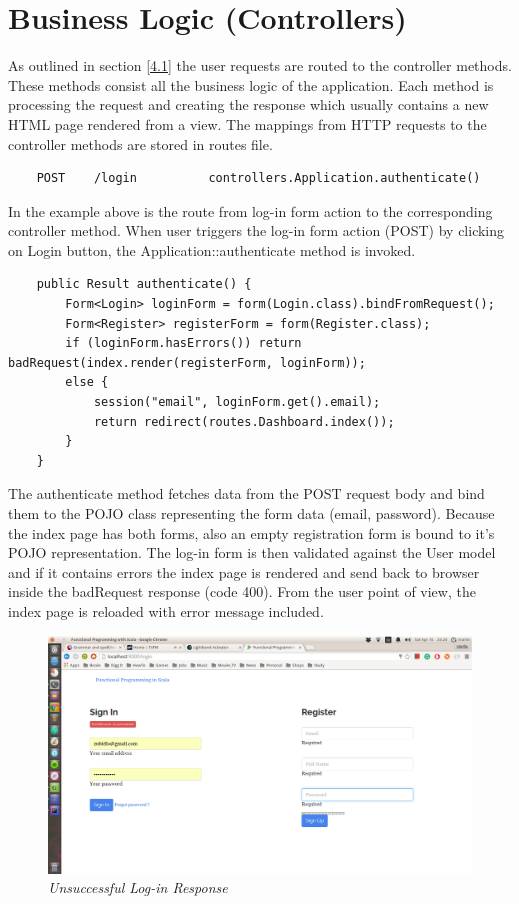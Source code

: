 \documentclass[12pt,twoside,a4paper]{report}
\begin{document}
\section{Business Logic (Controllers)}\label{4.5}
As outlined in section \ref{4.1} the user requests are routed to the controller methods. These methods consist all the business logic of the application. Each method is processing the request and creating the response which usually contains a new HTML page rendered from a view. The mappings from HTTP requests to the controller methods are stored in routes file.

\begin{lstlisting}
	POST    /login     		controllers.Application.authenticate()
\end{lstlisting}

In the example above is the route from log-in form action to the corresponding controller method. When user triggers the log-in form action (POST) by clicking on Login button, the Application::authenticate method is invoked.

\begin{lstlisting}
	public Result authenticate() {
        Form<Login> loginForm = form(Login.class).bindFromRequest();
        Form<Register> registerForm = form(Register.class);
        if (loginForm.hasErrors()) return badRequest(index.render(registerForm, loginForm));
        else {
            session("email", loginForm.get().email);
            return redirect(routes.Dashboard.index());
        }
    }
\end{lstlisting}

The authenticate method fetches data from the POST request body and bind them to the POJO class representing the form data (email, password). Because the index page has both forms, also an empty registration form is bound to it's POJO representation. The log-in form is then validated against the User model and if it contains errors the index page is rendered and send back to browser inside the badRequest response (code 400). From the user point of view, the index page is reloaded with error message included.

\begin{figure}[!ht]
	\centering
		\includegraphics[width=1\textwidth, totalheight=8cm]
		{invalid_user_or_password_view}
	\caption{\textit{Unsuccessful Log-in Response}}
	\label{f4.5.1}
\end{figure}
\end{document}
